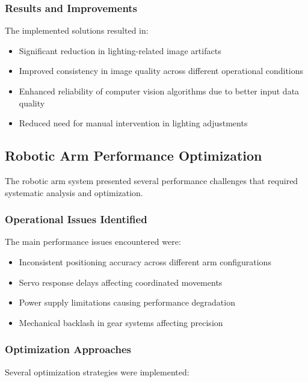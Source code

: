\documentclass{book}
\begin{document}
\subsubsection{Results and Improvements}
\par\noindent The implemented solutions resulted in:

\begin{itemize}
\item Significant reduction in lighting-related image artifacts
\item Improved consistency in image quality across different operational conditions
\item Enhanced reliability of computer vision algorithms due to better input data quality
\item Reduced need for manual intervention in lighting adjustments
\end{itemize}

\subsection{Robotic Arm Performance Optimization}

\par\noindent The robotic arm system presented several performance challenges that required systematic analysis and optimization.

\subsubsection{Operational Issues Identified}
\par\noindent The main performance issues encountered were:

\begin{itemize}
\item Inconsistent positioning accuracy across different arm configurations
\item Servo response delays affecting coordinated movements
\item Power supply limitations causing performance degradation
\item Mechanical backlash in gear systems affecting precision
\end{itemize}

\subsubsection{Optimization Approaches}
\par\noindent Several optimization strategies were implemented:
\end{document}
